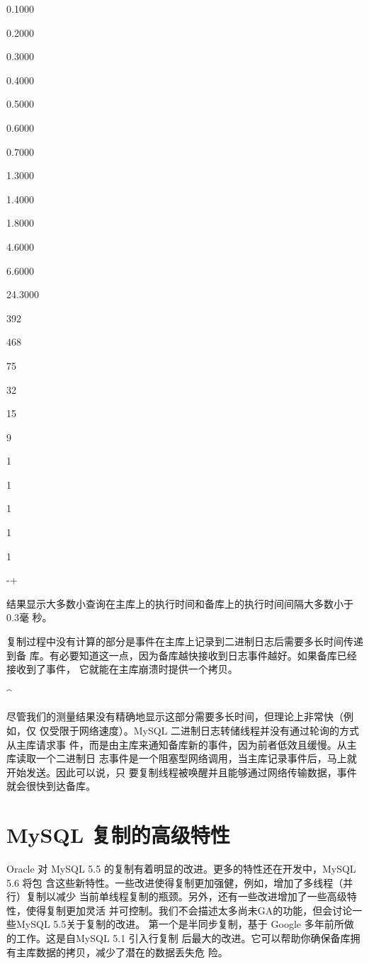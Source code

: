 0.1000

0.2000

0.3000

0.4000

0.5000

0.6000

0.7000

1.3000

1.4000

1.8000

4.6000

6.6000

24.3000

392

468

75

32

15

9

1

1

1

1

1

-+

结果显示大多数小查询在主库上的执行时间和备库上的执行时间间隔大多数小于0.3毫
秒。

复制过程中没有计算的部分是事件在主库上记录到二进制日志后需要多长时间传递到备
库。有必要知道这一点，因为备库越快接收到日志事件越好。如果备库已经接收到了事件，
它就能在主库崩溃时提供一个拷贝。

^

尽管我们的测量结果没有精确地显示这部分需要多长时间，但理论上非常快（例如，仅
仅受限于网络速度）。MySQL 二进制日志转储线程并没有通过轮询的方式从主库请求事
件，而是由主库来通知备库新的事件，因为前者低效且缓慢。从主库读取一个二进制日
志事件是一个阻塞型网络调用，当主库记录事件后，马上就开始发送。因此可以说，只
要复制线程被唤醒并且能够通过网络传输数据，事件就会很快到达备库。

\section{MySQL 复制的高级特性}
Oracle 对 MySQL 5.5 的复制有着明显的改进。更多的特性还在开发中，MySQL 5.6 将包
含这些新特性。一些改进使得复制更加强健，例如，增加了多线程（并行）复制以减少
当前单线程复制的瓶颈。另外，还有一些改进增加了一些高级特性，使得复制更加灵活
并可控制。我们不会描述太多尚未GA的功能，但会讨论一些MySQL 5.5关于复制的改进。
第一个是半同步复制，基于 Google 多年前所做的工作。这是自MySQL 5.1 引入行复制
后最大的改进。它可以帮助你确保备库拥有主库数据的拷贝，减少了潜在的数据丢失危
险。

